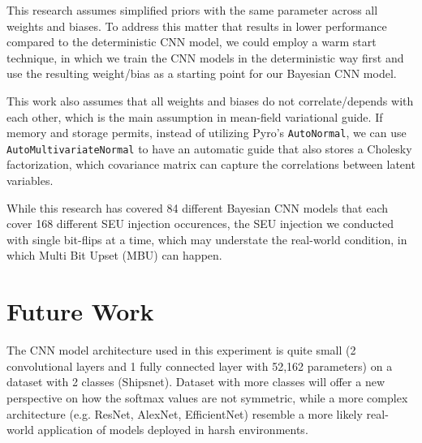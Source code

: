 \documentclass[ %
                    author={Revalda Putawara},
                supervisor={Dr. James Pope},
                    degree={MSc},
                     title={Robustness of Bayesian Neural Networks Design Choices Against Weight and Bias Perturbation Induced by Single Event Upsets (SEUs)},
                      type={},
                      year={2025}]{dissertation}
\begin{document}
This research assumes simplified priors with the same parameter across all weights and biases. To address this matter that results in lower performance compared to the deterministic CNN model, we could employ a warm start technique, in which we train the CNN models in the deterministic way first and use the resulting weight/bias as a starting point for our Bayesian CNN model. 

This work also assumes that all weights and biases do not correlate/depends with each other, which is the main assumption in mean-field variational guide. If memory and storage permits, instead of utilizing Pyro's \texttt{AutoNormal}, we can use \texttt{AutoMultivariateNormal} to have an automatic guide that also stores a Cholesky factorization, which covariance matrix can capture the correlations between latent variables.

While this research has covered 84 different Bayesian CNN models that each cover 168 different SEU injection occurences, the SEU injection we conducted with single bit-flips at a time, which may understate the real-world condition, in which Multi Bit Upset (MBU) can happen.

\section{Future Work}

The CNN model architecture used in this experiment is quite small (2 convolutional layers and 1 fully connected layer with 52,162 parameters) on a dataset with 2 classes (Shipsnet). Dataset with more classes will offer a new perspective on how the softmax values are not symmetric, while a more complex architecture (e.g. ResNet, AlexNet, EfficientNet) resemble a more likely real-world application of models deployed in harsh environments.

\end{document}
